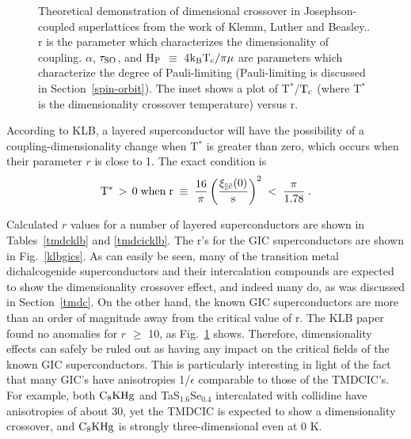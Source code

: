 \begin{figure} 
\vspace{6.5in}
\caption[Theoretical  demon\-stra\-tion  of
di\-men\-sional      cross\-over            in            Josephson-coupled
superlattices.]{Theoretical        demon\-stra\-tion  of    di\-men\-sional
cross\-over  in  Josephson-coupled  superlattices from the   work of Klemm,
Luther and Beasley.\cite{klemm75}.  r  is the parameter which characterizes
the dimensionality of coupling.   $\alpha$, $\rm \tau_{SO}$, and  H$\rm _P$
$\equiv$ 4$\rm k_B  T_c/ \pi \mu$  are  parameters which  characterize  the
degree   of    Pauli-limiting   (Pauli-limiting      is     discussed    in
Section~\ref{spin-orbit}).  The  inset shows a   plot of  T$^*$/$\rm   T_c$
(where T$^*$ is the dimensionality crossover temperature) versus r.}
\label{klbfig} 
\end{figure}

        According   to  KLB,   a layered   superconductor   will have   the
possibility of a coupling-dimensionality change when  T$^*$ is greater than
zero, which occurs  when  their parameter  $r$  is close  to 1.  The  exact
condition is\\

\begin{equation}
\label{klbparam}
\rm T^* \, > \, 0 \; when \; r \; \equiv \; \frac{16}{\pi} \left( \frac{\xi_{\parallel \hat{c}}(0)}{s}
\right)^2  \; < \; \frac{\pi}{1.78} \; .
\end{equation}

\noindent Calculated $r$ values for a number of layered superconductors are 
shown in Tables~\ref{tmdcklb} and  \ref{tmdcicklb}.  The r's  for  the  GIC
superconductors are  shown in  Fig.~\ref{klbgics}.  As  can easily be seen,
many  of the  transition  metal  dichalcogenide superconductors  and their
intercalation compounds  are  expected to show the dimensionality crossover
effect,  and      indeed     many  do,      as     was      discussed    in
Section~\ref{tmdc}.\cite{coleman83,prober80} On  the other  hand, the known
GIC superconductors are  more than an  order  of magnitude   away  from the
critical  value of r.    The KLB paper  found  no anomalies for $r$  $\geq$
10,\cite{klemm75} as  Fig.~\ref{klbfig}  shows.  Therefore,  dimensionality
effects can safely be ruled out as having any impact on the critical fields
of  the known  GIC superconductors.   This is  particularly  interesting in
light of the fact that many GIC's have anisotropies 1/$\epsilon$ comparable
to  those of   the  TMDCIC's.    For   example, both   $\rm   C_8KHg$   and
TaS$_{1.6}$Se$_{0.4}$  intercalated  with   collidine have  anisotropies of
about 30, yet  the  TMDCIC is expected to  show a dimensionality crossover,
and $\rm C_8KHg$ is strongly three-dimensional even at 0 K.

